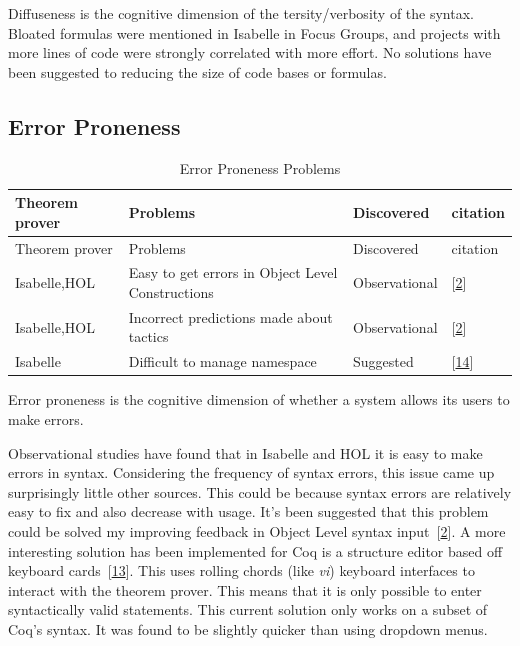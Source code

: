 \documentclass[
]{article}
\begin{document}
Diffuseness is the cognitive dimension of the tersity/verbosity of the
syntax. Bloated formulas were mentioned in Isabelle in Focus Groups, and
projects with more lines of code were strongly correlated with more
effort. No solutions have been suggested to reducing the size of code
bases or formulas.

\hypertarget{error-proneness-1}{%
\subsection{Error Proneness}\label{error-proneness-1}}

\hypertarget{tbl:error_proneness}{}
\begin{longtable}[]{@{}llll@{}}
\caption{\label{tbl:error_proneness}Error Proneness
Problems}\tabularnewline
\toprule
Theorem prover & Problems & Discovered & citation \\
\midrule
\endfirsthead
\toprule
Theorem prover & Problems & Discovered & citation \\
\midrule
\endhead
Isabelle,HOL & Easy to get errors in Object Level Constructions &
Observational & {[}\protect\hyperlink{ref-aitken_analysis_2000}{2}{]} \\
Isabelle,HOL & Incorrect predictions made about tactics & Observational
& {[}\protect\hyperlink{ref-aitken_analysis_2000}{2}{]} \\
Isabelle & Difficult to manage namespace & Suggested &
{[}\protect\hyperlink{ref-bourke_challenges_2012}{14}{]} \\
\bottomrule
\end{longtable}

Error proneness is the cognitive dimension of whether a system allows
its users to make errors.

Observational studies have found that in Isabelle and HOL it is easy to
make errors in syntax. Considering the frequency of syntax errors, this
issue came up surprisingly little other sources. This could be because
syntax errors are relatively easy to fix and also decrease with usage.
It's been suggested that this problem could be solved my improving
feedback in Object Level syntax
input~{[}\protect\hyperlink{ref-aitken_analysis_2000}{2}{]}. A more
interesting solution has been implemented for Coq is a structure editor
based off keyboard
cards~{[}\protect\hyperlink{ref-berman_development_2014}{13}{]}. This
uses rolling chords (like \emph{vi}) keyboard interfaces to interact
with the theorem prover. This means that it is only possible to enter
syntactically valid statements. This current solution only works on a
subset of Coq's syntax. It was found to be slightly quicker than using
dropdown menus.
\end{document}
